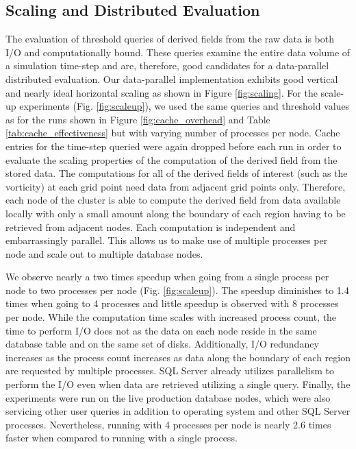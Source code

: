 \documentclass{sig-alternate}
\begin{document}
\subsection{Scaling and Distributed Evaluation}
The evaluation of threshold queries of derived fields from the raw data is both I/O and computationally bound. These queries examine the entire data
volume of a simulation time-step and are, therefore, good candidates for a data-parallel distributed evaluation. 
Our data-parallel implementation exhibits good vertical and nearly ideal horizontal scaling as shown in Figure \ref{fig:scaling}. 
For the scale-up experiments (Fig. \ref{fig:scaleup}), we used the same
queries and threshold values as for the runs shown in Figure \ref{fig:cache_overhead} and Table \ref{tab:cache_effectiveness} 
but with varying number of processes per node. Cache entries for the
time-step queried were again dropped before each run in order to evaluate the scaling properties of the computation of the derived field from the stored data.
The computations for all of 
the derived fields of interest (such as the vorticity) at each grid point need data from adjacent grid points only. Therefore, each node of the cluster is able to
compute the derived field from data available locally with only a small amount along the boundary of each region having to be retrieved from adjacent nodes.
Each computation is independent and embarrassingly parallel. This allows us to make use of multiple processes per node and scale out to
multiple database nodes.

We observe nearly a two times speedup when going from a single process per node to two processes per node (Fig. \ref{fig:scaleup}). 
The speedup diminishes to 1.4 times when going to 4 processes and little speedup is 
observed with 8 processes per node.
While the computation time scales with increased process count, the time to perform I/O does not as the data on each node reside in the same 
database table and on the same set of disks. Additionally, I/O redundancy increases as the process count increases as data along the boundary 
of each region are requested by multiple processes.
SQL Server already utilizes parallelism to perform the I/O even when data are retrieved utilizing a single query.
Finally, the experiments were run on the live production database nodes, which were also servicing other user queries in addition to operating system
and other SQL Server processes. Nevertheless, running with 4 processes per node is nearly 2.6 times faster when
compared to running with a single process.
\end{document}
